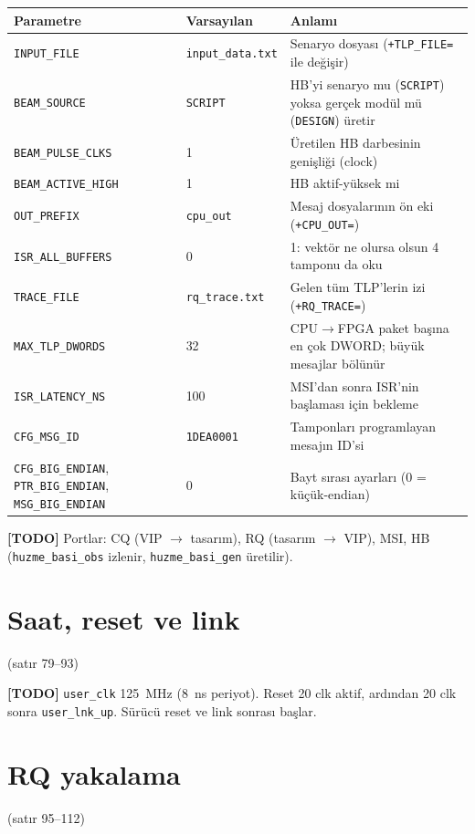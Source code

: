 \documentclass[11pt,a4paper]{article}
\newcommand{\kod}[1]{\texttt{#1}}
\newcommand{\todo}[1]{\textcolor{red!60!black}{\textbf{[TODO]} #1}}
\newcommand{\satir}[1]{\textcolor{black!60}{\scriptsize(satır #1)}}
\begin{document}
\begin{longtable}{@{}p{3.8cm}p{2.6cm}p{8.5cm}@{}}
\toprule
Parametre & Varsayılan & Anlamı \\
\midrule
\endhead
\kod{INPUT\_FILE} & \kod{input\_data.txt} & Senaryo dosyası (\kod{+TLP\_FILE=} ile değişir) \\
\kod{BEAM\_SOURCE} & \kod{SCRIPT} & HB'yi senaryo mu (\kod{SCRIPT}) yoksa gerçek modül mü (\kod{DESIGN}) üretir \\
\kod{BEAM\_PULSE\_CLKS} & 1 & Üretilen HB darbesinin genişliği (clock) \\
\kod{BEAM\_ACTIVE\_HIGH} & 1 & HB aktif-yüksek mi \\
\kod{OUT\_PREFIX} & \kod{cpu\_out} & Mesaj dosyalarının ön eki (\kod{+CPU\_OUT=}) \\
\kod{ISR\_ALL\_BUFFERS} & 0 & 1: vektör ne olursa olsun 4 tamponu da oku \\
\kod{TRACE\_FILE} & \kod{rq\_trace.txt} & Gelen tüm TLP'lerin izi (\kod{+RQ\_TRACE=}) \\
\kod{MAX\_TLP\_DWORDS} & 32 & CPU$\to$FPGA paket başına en çok DWORD; büyük mesajlar bölünür \\
\kod{ISR\_LATENCY\_NS} & 100 & MSI'dan sonra ISR'nin başlaması için bekleme \\
\kod{CFG\_MSG\_ID} & \kod{1DEA0001} & Tamponları programlayan mesajın ID'si \\
\kod{CFG\_BIG\_ENDIAN}, \kod{PTR\_BIG\_ENDIAN}, \kod{MSG\_BIG\_ENDIAN} & 0 & Bayt sırası ayarları (0 = küçük-endian) \\
\bottomrule
\end{longtable}

\todo{Portlar: CQ (VIP $\to$ tasarım), RQ (tasarım $\to$ VIP), MSI, HB
(\kod{huzme\_basi\_obs} izlenir, \kod{huzme\_basi\_gen} üretilir).}

\section{Saat, reset ve link}
\satir{79--93}

\todo{\kod{user\_clk} 125~MHz (8~ns periyot). Reset 20 clk aktif, ardından 20 clk
sonra \kod{user\_lnk\_up}. Sürücü reset ve link sonrası başlar.}

\section{RQ yakalama}
\satir{95--112}
\end{document}
